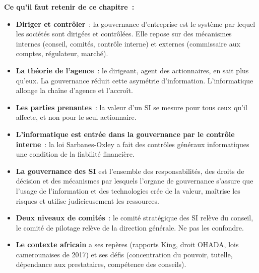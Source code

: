 \separateur

\begin{boxresume}
\textbf{Ce qu'il faut retenir de ce chapitre~:}
\begin{itemize}
    \item \textbf{Diriger et contrôler}~: la gouvernance d'entreprise est le
          système par lequel les sociétés sont dirigées et contrôlées. Elle
          repose sur des mécanismes internes (conseil, comités, contrôle
          interne) et externes (commissaire aux comptes, régulateur,
          marché).
    \item \textbf{La théorie de l'agence}~: le dirigeant, agent des
          actionnaires, en sait plus qu'eux. La gouvernance réduit cette
          asymétrie d'information. L'informatique allonge la chaîne
          d'agence et l'accroît.
    \item \textbf{Les parties prenantes}~: la valeur d'un SI se mesure pour
          tous ceux qu'il affecte, et non pour le seul actionnaire.
    \item \textbf{L'informatique est entrée dans la gouvernance par le
          contrôle interne}~: la loi Sarbanes-Oxley a fait des contrôles
          généraux informatiques une condition de la fiabilité financière.
    \item \textbf{La gouvernance des SI} est l'ensemble des
          responsabilités, des droits de décision et des mécanismes par
          lesquels l'organe de gouvernance s'assure que l'usage de
          l'information et des technologies crée de la valeur, maîtrise les
          risques et utilise judicieusement les ressources.
    \item \textbf{Deux niveaux de comités}~: le comité stratégique des SI
          relève du conseil, le comité de pilotage relève de la direction
          générale. Ne pas les confondre.
    \item \textbf{Le contexte africain} a ses repères (rapports King, droit
          OHADA, lois camerounaises de 2017) et ses défis (concentration du
          pouvoir, tutelle, dépendance aux prestataires, compétence des
          conseils).
\end{itemize}
\end{boxresume}

\bigskip

